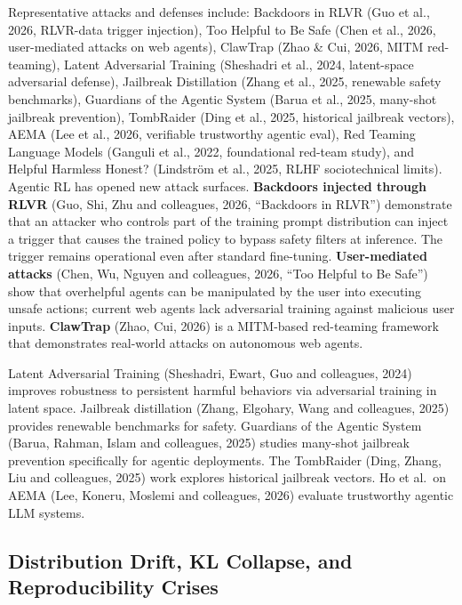 Representative attacks and defenses include: Backdoors in RLVR (Guo et al., 2026, RLVR-data trigger injection), Too Helpful to Be Safe (Chen et al., 2026, user-mediated attacks on web agents), ClawTrap (Zhao \& Cui, 2026, MITM red-teaming), Latent Adversarial Training (Sheshadri et al., 2024, latent-space adversarial defense), Jailbreak Distillation (Zhang et al., 2025, renewable safety benchmarks), Guardians of the Agentic System (Barua et al., 2025, many-shot jailbreak prevention), TombRaider (Ding et al., 2025, historical jailbreak vectors), AEMA (Lee et al., 2026, verifiable trustworthy agentic eval), Red Teaming Language Models (Ganguli et al., 2022, foundational red-team study), and Helpful Harmless Honest? (Lindström et al., 2025, RLHF sociotechnical limits). Agentic RL has opened new attack surfaces. \textbf{Backdoors injected through RLVR} (Guo, Shi, Zhu and colleagues, 2026, ``Backdoors in RLVR'') demonstrate that an attacker who controls part of the training prompt distribution can inject a trigger that causes the trained policy to bypass safety filters at inference. The trigger remains operational even after standard fine-tuning. \textbf{User-mediated attacks} (Chen, Wu, Nguyen and colleagues, 2026, ``Too Helpful to Be Safe'') show that overhelpful agents can be manipulated by the user into executing unsafe actions; current web agents lack adversarial training against malicious user inputs. \textbf{ClawTrap} (Zhao, Cui, 2026) is a MITM-based red-teaming framework that demonstrates real-world attacks on autonomous web agents.

Latent Adversarial Training (Sheshadri, Ewart, Guo and colleagues, 2024) improves robustness to persistent harmful behaviors via adversarial training in latent space. Jailbreak distillation (Zhang, Elgohary, Wang and colleagues, 2025) provides renewable benchmarks for safety. Guardians of the Agentic System (Barua, Rahman, Islam and colleagues, 2025) studies many-shot jailbreak prevention specifically for agentic deployments. The TombRaider (Ding, Zhang, Liu and colleagues, 2025) work explores historical jailbreak vectors. Ho et al.~on AEMA (Lee, Koneru, Moslemi and colleagues, 2026) evaluate trustworthy agentic LLM systems.

\subsection{Distribution Drift, KL Collapse, and Reproducibility Crises}\label{distribution-drift-kl-collapse-and-reproducibility-crises}

